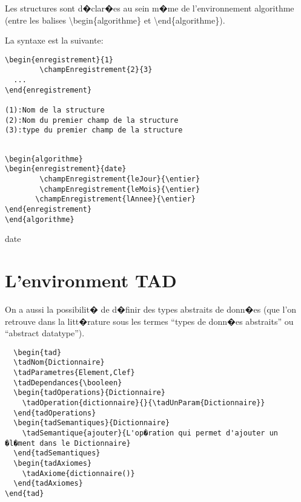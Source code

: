 \documentclass[a4paper,12pt]{report}
\begin{document}
{Les structures sont d�clar�es au sein m�me de l'environnement algorithme (entre les balises \textbackslash begin\{algorithme\} et \textbackslash end\{algorithme\}).

La syntaxe est la suivante:
\begin{lstlisting}
\begin{enregistrement}{1}
        \champEnregistrement{2}{3}
  ...
\end{enregistrement}

(1):Nom de la structure
(2):Nom du premier champ de la structure
(3):type du premier champ de la structure
\end{lstlisting}


\begin{lstlisting}

\begin{algorithme}
\begin{enregistrement}{date}
        \champEnregistrement{leJour}{\entier}
        \champEnregistrement{leMois}{\entier}
       \champEnregistrement{lAnnee}{\entier}
\end{enregistrement}
\end{algorithme}
\end{lstlisting}
\begin{algorithme}
\begin{enregistrement}{date}
\end{enregistrement}
\end{algorithme}



\section{L'environment TAD}


On a aussi la possibilit� de d�finir des types abstraits de donn�es
(que l'on retrouve dans la litt�rature sous les termes ``types de donn�es
abstraits'' ou ``abstract datatype'').

\begin{lstlisting}
  \begin{tad}
  \tadNom{Dictionnaire}
  \tadParametres{Element,Clef}
  \tadDependances{\booleen}
  \begin{tadOperations}{Dictionnaire}
    \tadOperation{dictionnaire}{}{\tadUnParam{Dictionnaire}}
  \end{tadOperations}
  \begin{tadSemantiques}{Dictionnaire}
    \tadSemantique{ajouter}{L'op�ration qui permet d'ajouter un �l�ment dans le Dictionnaire}
  \end{tadSemantiques}
  \begin{tadAxiomes}
    \tadAxiome{dictionnaire()}
  \end{tadAxiomes}
\end{tad}
\end{lstlisting}


}
\end{document}
